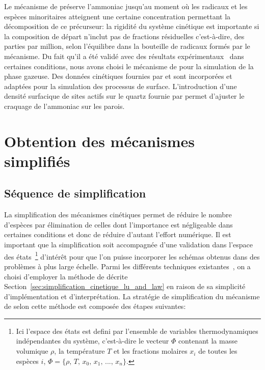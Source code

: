 Le mécanisme de \citet{Dirtu2006} préserve l'ammoniac jusqu'au moment où les radicaux et les espèces minoritaires atteignent une certaine concentration permettant la décomposition de ce précurseur: la rigidité du système cinétique est importante si la composition de départ n'inclut pas de fractions résiduelles \textendash{} c'est-à-dire, des parties par million, selon l'équilibre dans la bouteille \textendash{} de radicaux formés par le mécanisme. Du fait qu'il a été validé avec des résultats expérimentaux~\cite{Dirtu2006,Odochian2011} dans certaines conditions, nous avons choisi le mécanisme de \citet{Dirtu2006} pour la simulation de la phase gazeuse. Des données cinétiques fournies par \citet{Cooper1988} et \citet{Ertl1980} sont incorporées et adaptées pour la simulation des processus de surface. L'introduction d'une densité surfacique de sites actifs sur le quartz fournie par \citet{Tang20151161} permet d'ajuster le craquage de l'ammoniac sur les parois. %

\section{Obtention des mécanismes simplifiés}
\label{sec:simplification-mechanisme}

\subsection{Séquence de simplification}

La simplification des mécanismes cinétiques permet de réduire le nombre d'espèces par élimination de celles dont l'importance est négligeable dans certaines conditions et donc de réduire d'autant l'effort numérique. Il est important que la simplification soit accompagnée d'une validation dans l'espace des états~\footnote{Ici l'espace des états est defini par l'ensemble de variables thermodynamiques indépendantes du système, c'est-à-dire le vecteur $\Phi$ contenant la masse volumique $\rho$, la température $T$ et les fractions molaires $x_{i}$ de toutes les espèces $i$, $\Phi=\{\rho,\,T,\,x_{0},\,x_{1},\,...,\,x_{n}\}$.} d'intérêt pour que l'on puisse incorporer les schémas obtenus dans des problèmes à plus large échelle. Parmi les différents techniques existantes~\cite{Coles2011}, on a choisi d'employer la méthode de \citet{Lu2005} décrite Section~\ref{sec:simplification_cinetique_lu_and_law} en raison de sa simplicité d'implémentation et d'interprétation. La stratégie de simplification du mécanisme de \citet{Norinaga2009} selon cette méthode est composée des étapes suivantes:

